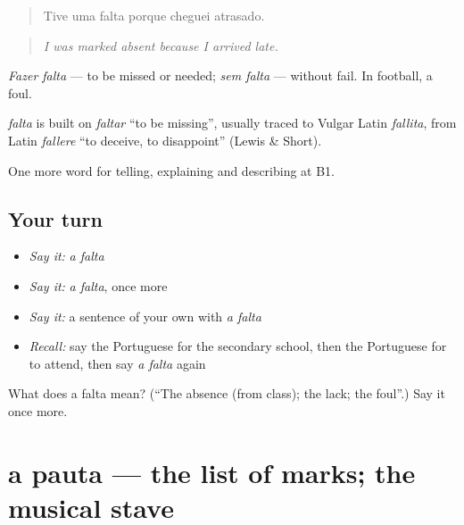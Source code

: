\begin{quote}
Tive uma falta porque cheguei atrasado.
\end{quote}

\begin{quote}
\emph{I was marked absent because I arrived late.}
\end{quote}

\emph{Fazer falta} — to be missed or needed; \emph{sem falta} — without fail. In football, a foul.

\begin{cousinweb}
\emph{falta} is built on \emph{faltar} \textquotedblleft{}to be missing\textquotedblright{}, usually traced to Vulgar Latin \emph{fallita}, from Latin \emph{fallere} \textquotedblleft{}to deceive, to disappoint\textquotedblright{} (Lewis \& Short).
\end{cousinweb}

\begin{grammarlens}[title={What you've built}]
One more word for telling, explaining and describing at B1.
\end{grammarlens}

\subsection*{Your turn}
\begin{itemize}
\raggedright
  \item \emph{Say it:} \emph{a falta}
  \item \emph{Say it:} \emph{a falta}, once more
  \item \emph{Say it:} a sentence of your own with \emph{a falta}
  \item \emph{Recall:} say the Portuguese for the secondary school, then the Portuguese for to attend, then say \emph{a falta} again
\end{itemize}

\begin{tcolorbox}[breakable,colback=teal!4,colframe=teal!35!black,title={Before you move on}]
What does a falta mean? (\textquotedblleft{}The absence (from class); the lack; the foul\textquotedblright{}.) Say it once more.
\end{tcolorbox}
\section[a pauta]{a pauta — the list of marks; the musical stave}

\label{lesson:PT-C375-pauta}



